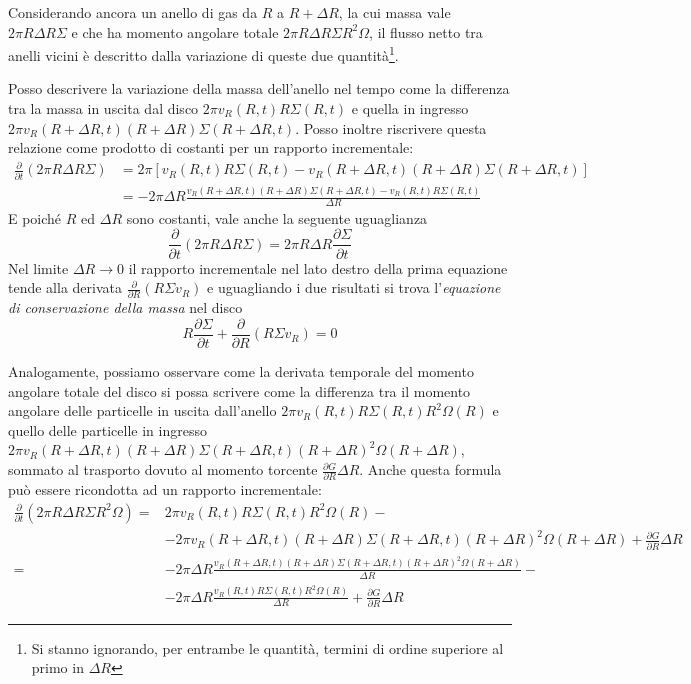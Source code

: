 \documentclass[a4paperbi]{article}
\begin{document}
	Considerando ancora un anello di gas da $R$ a $R+\Delta R$, la cui massa vale $2\pi R\Delta R\Sigma$ e che ha momento angolare totale $2\pi R\Delta R\Sigma R^2\Omega$, il flusso netto tra anelli vicini è descritto dalla variazione di queste due quantità\footnote{Si stanno ignorando, per entrambe le quantità, termini di ordine superiore al primo in $\Delta R$}. 
	
	Posso descrivere la variazione della massa dell'anello nel tempo come la differenza tra la massa in uscita dal disco $2\pi v_R(R,t)R\Sigma(R,t)$ e quella in ingresso $2\pi v_R(R+\Delta R,t)(R+\Delta R)\Sigma(R+\Delta R,t)$. Posso inoltre riscrivere questa relazione come prodotto di costanti per un rapporto incrementale:
	\begin{align*}
		\frac{\partial}{\partial t}(2\pi R\Delta R\Sigma)&=2\pi\left[v_R(R,t)R\Sigma(R,t)-v_R(R+\Delta R,t)(R+\Delta R)\Sigma(R+\Delta R,t)\right]\\
		&=-2\pi\Delta R\frac{v_R(R+\Delta R,t)(R+\Delta R)\Sigma(R+\Delta R,t)-v_R(R,t)R\Sigma(R,t)}{\Delta R}
	\end{align*}
	E poiché $R$ ed $\Delta R$ sono costanti, vale anche la seguente uguaglianza
	\begin{equation}
		\frac{\partial}{\partial t}(2\pi R\Delta R\Sigma)=2\pi R\Delta R \frac{\partial\Sigma}{\partial t}
	\end{equation}
    Nel limite $\Delta R\rightarrow 0$ il rapporto incrementale nel lato destro della prima equazione tende alla derivata $\frac{\partial}{\partial R}(R\Sigma v_R)$ e uguagliando i due risultati si trova l'\textit{equazione di conservazione della massa} nel disco
	\begin{equation}
		R\frac{\partial\Sigma}{\partial t}+\frac{\partial}{\partial R}(R\Sigma v_R)=0
	\end{equation}
	
	Analogamente, possiamo osservare come la derivata temporale del momento angolare totale del disco si possa scrivere come la differenza tra il momento angolare delle particelle in uscita dall'anello $2\pi v_R(R,t)R\Sigma(R,t)R^2\Omega(R)$ e quello delle particelle in ingresso $2\pi v_R(R+\Delta R,t)(R+\Delta R)\Sigma(R+\Delta R,t)(R+\Delta R)^2\Omega(R+\Delta R)$, sommato al trasporto dovuto al momento torcente $\frac{\partial G}{\partial R}\Delta R$. Anche questa formula può essere ricondotta ad un rapporto incrementale:
	\begin{align*}
		\frac{\partial}{\partial t}(2\pi R\Delta R\Sigma R^2\Omega)=&2\pi v_R(R,t)R\Sigma(R,t)R^2\Omega(R)-\\&-2\pi v_R(R+\Delta R,t)(R+\Delta R)\Sigma(R+\Delta R,t)(R+\Delta R)^2\Omega(R+\Delta R)+\frac{\partial G}{\partial R}\Delta R\\
		=&-2\pi\Delta R\frac{v_R(R+\Delta R,t)(R+\Delta R)\Sigma(R+\Delta R,t)(R+\Delta R)^2\Omega(R+\Delta R)}{\Delta R}-\\
		&-2\pi\Delta R\frac{v_R(R,t)R\Sigma(R,t)R^2\Omega(R)}{\Delta R}+\frac{\partial G}{\partial R}\Delta R
	\end{align*}
\end{document}
